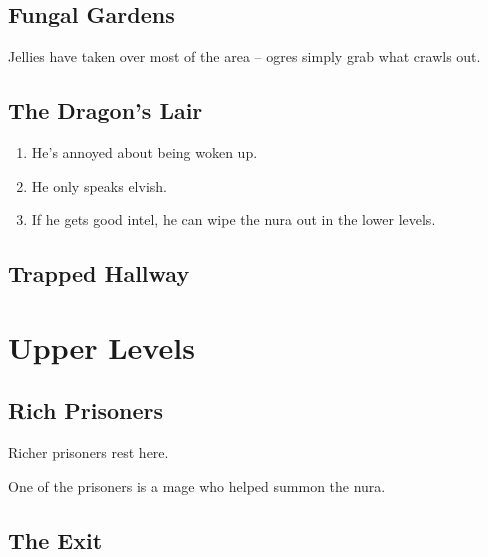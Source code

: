 \begin{multicols}{2}

\subsection{Fungal Gardens}

Jellies have taken over most of the area -- ogres simply grab what crawls out.


\subsection{The Dragon's Lair}

\dragon
\begin{enumerate}

	\item{He's annoyed about being woken up.}
	\item{He only speaks elvish.}
	\item{If he gets good intel, he can wipe the nura out in the lower levels.}

\end{enumerate}

\subsection{Trapped Hallway}


\section{Upper Levels}

\subsection{Rich Prisoners}

Richer prisoners rest here.

One of the prisoners is a mage who helped summon the nura.

\subsection{The Exit}

\end{multicols}

